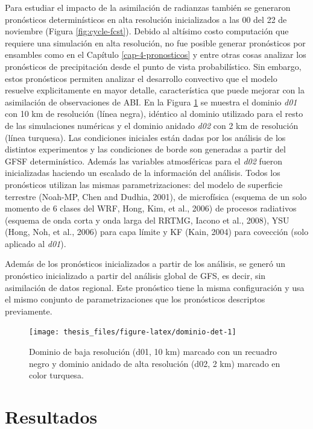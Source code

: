 \documentclass[12pt,oneside,a4paper]{reedthesis}
\begin{document}
Para estudiar el impacto de la asimilación de radianzas también se generaron pronósticos determinísticos en alta resolución inicializados a las 00 del 22 de noviembre (Figura \ref{fig:cycle-fcst}). Debido al altísimo costo computación que requiere una simulación en alta resolución, no fue posible generar pronósticos por ensambles como en el Capítulo \ref{cap-4-pronosticos} y entre otras cosas analizar los pronósticos de precipitación desde el punto de vista probabilístico. Sin embargo, estos pronósticos permiten analizar el desarrollo convectivo que el modelo resuelve explicitamente en mayor detalle, característica que puede mejorar con la asimilación de observaciones de ABI. En la Figura \ref{fig:dominio-det} se muestra el dominio \emph{d01} con 10 km de resolución (línea negra), idéntico al dominio utilizado para el resto de las simulaciones numéricas y el dominio anidado \emph{d02} con 2 km de resolución (línea turquesa). Las condiciones iniciales están dadas por los análisis de los distintos experimentos y las condiciones de borde son generadas a partir del GFSF determinístico. Además las variables atmosféricas para el \emph{d02} fueron inicializadas haciendo un escalado de la información del análisis. Todos los pronósticos utilizan las mismas parametrizaciones: del modelo de superficie terrestre (Noah-MP, Chen and Dudhia, 2001), de microfísica (esquema de un solo momento de 6 clases del WRF, Hong, Kim, et al., 2006) de procesos radiativos (esquema de onda corta y onda larga del RRTMG, Iacono et al., 2008), YSU (Hong, Noh, et al., 2006) para capa límite y KF (Kain, 2004) para covección (solo aplicado al \emph{d01}).

Además de los pronósticos inicializados a partir de los análisis, se generó un pronóstico inicializado a partir del análisis global de GFS, es decir, sin asimilación de datos regional. Este pronóstico tiene la misma configuración y usa el mismo conjunto de parametrizaciones que los pronósticos descriptos previamente.


\begin{figure}

{\centering \texttt{[image: thesis\_files/figure-latex/dominio-det-1]} 

}

\caption{Dominio de baja resolución (d01, 10 km) marcado con un recuadro negro y dominio anidado de alta resolución (d02, 2 km) marcado en color turquesa.}\label{fig:dominio-det}
\end{figure}
\hypertarget{resultados-2}{%
\section{Resultados}\label{resultados-2}}
\end{document}
